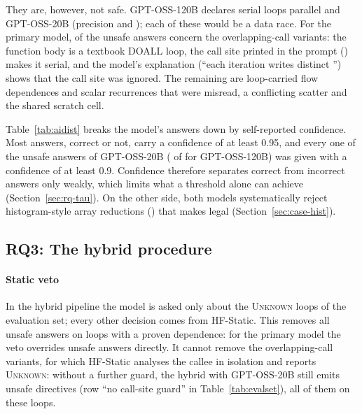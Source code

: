 

They are, however, not safe. GPT-OSS-120B declares \evAIOneTwentyFP{} serial loops parallel and GPT-OSS-20B \evAITwentyFP{} (precision \evAIOneTwentyPrec{} and \evAITwentyPrec{}); each of these would be a data race. For the primary model, \nAIFPQ{} of the unsafe answers concern the overlapping-call variants: the function body is a textbook DOALL loop, the call site printed in the prompt () makes it serial, and the model's explanation (``each iteration writes distinct '') shows that the call site was ignored. The remaining \nAIFPnonQ{} are loop-carried flow dependences and scalar recurrences that were misread, a conflicting scatter and the shared scratch cell.

Table~\ref{tab:aidist} breaks the model's answers down by self-reported confidence. Most answers, correct or not, carry a confidence of at least 0.95, and every one of the \aiUnsafeTwenty{} unsafe answers of GPT-OSS-20B (\aiHiConfUnsafeOneTwenty{} of \aiUnsafeOneTwenty{} for GPT-OSS-120B) was given with a confidence of at least 0.9. Confidence therefore separates correct from incorrect answers only weakly, which limits what a threshold alone can achieve (Section~\ref{sec:rq-tau}). On the other side, both models systematically reject histogram-style array reductions () that  makes legal (Section~\ref{sec:case-hist}).



\subsection{RQ3: The hybrid procedure}
\label{sec:rq-hybrid}

\paragraph{Static veto} In the hybrid pipeline the model is asked only about the \nEvalUnknown{} \textsc{Unknown} loops of the evaluation set; every other decision comes from HF-Static. This removes all unsafe answers on loops with a proven dependence: for the primary model the veto overrides \nVetoSaves{} unsafe answers directly. It cannot remove the overlapping-call variants, for which HF-Static analyses the callee in isolation and reports \textsc{Unknown}: without a further guard, the hybrid with GPT-OSS-20B still emits \evHTwentyFP{} unsafe directives (row ``no call-site guard'' in Table~\ref{tab:evalset}), all of them on these loops.

